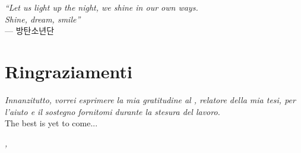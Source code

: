 
\cleardoublepage
{}
{}

\begin{flushright}{
	\slshape    
	``Let us light up the night, we shine in our own ways. \\
		Shine, dream, smile''} \\ 
	\medskip
    --- 방탄소년단
\end{flushright}


\bigskip

\begingroup
\let\clearpage\relax
\let\cleardoublepage\relax
\let\cleardoublepage\relax

\chapter*{Ringraziamenti}

\noindent \textit{Innanzitutto, vorrei esprimere la mia gratitudine al \profTitle \myProf, relatore della mia tesi, per l'aiuto e il sostegno fornitomi durante la stesura del lavoro.}\\

\noindent The best is yet to come...

%
\bigskip

\noindent\textit{\myLocation, \myTime}
\hfill \myName

\endgroup

